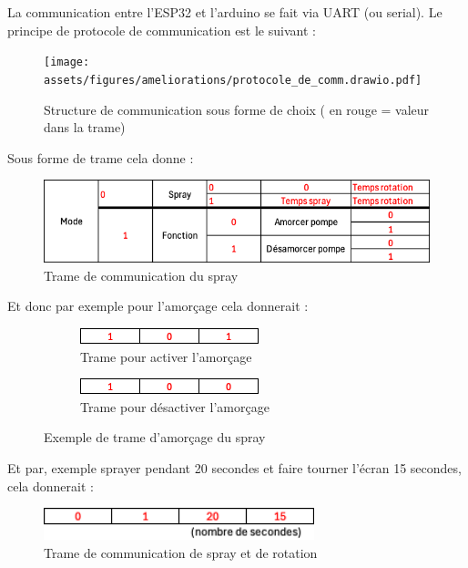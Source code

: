 \newpage
La communication entre l'ESP32 et l'arduino se fait via UART (ou serial). Le principe de protocole de communication est le suivant :
\begin{figure}[H]
    \centering
    \texttt{[image: assets/figures/ameliorations/protocole\_de\_comm.drawio.pdf]}
    \caption[Structure de communication]{Structure de communication sous forme de choix ( en \color{red} rouge \color{black} = valeur dans la trame)}
\end{figure}
Sous forme de trame cela donne :
\begin{figure}[H]
    \centering
    \includegraphics[page = 1, width = \textwidth]{assets/figures/ameliorations/trame_spray.png}
    \caption[Trame de communication du spray]{Trame de communication du spray}
\end{figure}
Et donc par exemple pour l'amorçage cela donnerait :
\begin{figure}[H]
    \centering
    \begin{subfigure}{.5\textwidth}
        \centering
        \includegraphics[width=0.9\linewidth]{assets/figures/ameliorations/trame_amorcage_on.png}
        \caption{Trame pour activer l'amorçage}

    \end{subfigure}%
    \begin{subfigure}{.5\textwidth}
        \centering
        \includegraphics[width=0.9\linewidth]{assets/figures/ameliorations/trame_amorcage_off.png}
        \caption{Trame pour désactiver l'amorçage}

    \end{subfigure}
    \caption{Exemple de trame d'amorçage du spray}

\end{figure}
Et par, exemple sprayer pendant 20 secondes et faire tourner l'écran 15 secondes, cela donnerait :
\begin{figure}[H]
    \centering
    \includegraphics[page = 1, width = 0.7\textwidth]{assets/figures/ameliorations/trame_rota_spray.png}
    \caption{Trame de communication de spray et de rotation}
\end{figure}

